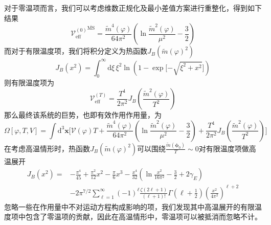 对于零温项而言，我们可以考虑维数正规化及最小差值方案进行重整化，得到如下结果
\begin{equation}
    {\mathscr{V}_\mathrm{eff}^{(0)}}^{\overline{\text{MS}}} = \frac{\tilde{m}^4(\varphi)}{64\pi^2}\left( \ln \frac{\tilde{m}^2(\varphi)}{\mu^2}-\frac{3}{2} \right)
\end{equation}
而对于有限温度项，我们将积分定义为热函数$J_B(\tilde{m}(\varphi)^2)$
\begin{equation}
    J_B(x^2) = \int_0^\infty \mathrm{d}\xi\, \xi^2\ln\left( 1- \exp\Big[{-\sqrt{\xi^2+x^2}}\Big] \right)
\end{equation}
则有限温度项为
\begin{equation}
    \mathscr{V}_\mathrm{eff}^{(T)} = \frac{T^4}{2\pi^2}J_B\left(\frac{\tilde{m}^2(\varphi)}{T^2}\right)
\end{equation}
那么最终该系统的巨势，也即有效作用作用量，为
\begin{equation}
    \Omega[\varphi,T,V]=\int\mathrm{d}^3\boldsymbol{x}\Big [  \mathscr{V}(\varphi)T + \frac{\tilde{m}^4(\varphi)}{64\pi^2}\left( \ln \frac{\tilde{m}^2(\varphi)}{\mu^2}-\frac{3}{2} \right) +  \frac{T^4}{2\pi^2}J_B\left(\frac{\tilde{m}^2(\varphi)}{T^2}\right)  \Big]
\end{equation}
在考虑高温情形时，热函数$J_B(\tilde{m}(\varphi)^2)$可以围绕$\frac{\tilde{m}(\boldsymbol{\phi}_0)}{T}\sim0$对有限温度项做高温展开
\begin{equation}
\begin{split}
        J_B(x^2)= &-\frac{\pi^4}{45}+\frac{\pi^2}{12}x^2 - \frac{\pi}{6}x^3-\frac{x^4}{32}\left(\ln\frac{x^2}{16\pi^2} -\frac{3}{2} + 2\gamma_E\right)\\
    &-2\pi^{7/2}\sum_{\ell=1}^\infty (-1)^\ell \frac{\zeta(2\ell+1)}{(\ell+1)!}\Gamma(\ell+\frac{1}{2})(\frac{x^2}{4\pi^2})^{\ell+2}
\end{split}
\end{equation}
忽略一些在作用量中不对运动方程构成影响的项，我们发现其中高温展开的有限温度项中包含了零温项的贡献，因此在高温情形中，零温项可以被抵消而忽略不计。

